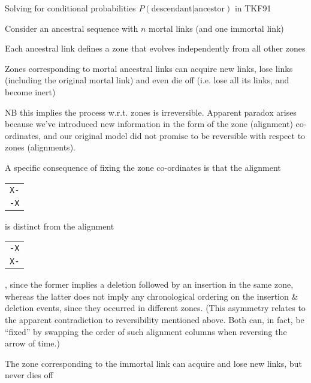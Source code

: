 \documentclass{beamer}
\begin{document}
\begin{frame}{}

Solving for conditional probabilities $P(\mbox{descendant}|\mbox{ancestor})$ in TKF91
 \itemb
 \item Consider an ancestral sequence with $n$ mortal links (and one immortal link)
 \item Each ancestral link defines a zone that evolves independently from all other zones
 \item Zones corresponding to mortal ancestral links can acquire new links, lose links (including the original mortal link) and even die off
(i.e. lose all its links, and become inert)
  \itemb
  \item NB this implies the process w.r.t. zones is irreversible. Apparent paradox arises because we've introduced new information
in the form of the zone (alignment) co-ordinates, and our original model did not promise to be reversible with respect to zones (alignments).
  \item A specific consequence of fixing the zone co-ordinates is that the alignment
\begin{tabular}{l} {\tt X-} \\ {\tt -X} \end{tabular}
is distinct from the alignment
\begin{tabular}{l} {\tt -X} \\ {\tt X-} \end{tabular},
since the former implies a deletion followed by an insertion in the same zone,
whereas the latter does not imply any chronological ordering on the insertion \& deletion events, since they occurred in different zones.
(This asymmetry relates to the apparent contradiction to reversibility mentioned above. Both can, in fact, be ``fixed'' by swapping the order of such alignment columns when reversing the arrow of time.)
  \iteme
 \item The zone corresponding to the immortal link can acquire and lose new links, but never dies off
\iteme
\end{frame}
\end{document}
